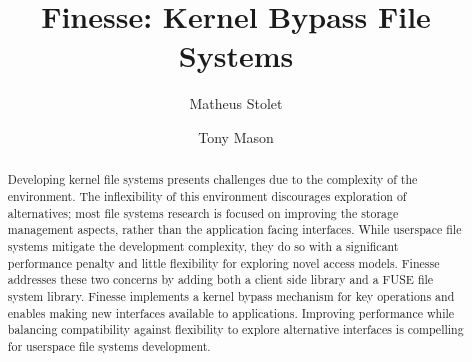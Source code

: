 \documentclass[sigplan,10pt,letter,plain]{acmart}
\begin{document}
\title{Finesse: Kernel Bypass File Systems}


\author{Matheus Stolet}
\author{Tony Mason}

\renewcommand{\shortauthors}{M. Stolet et al.}

\begin{abstract}
  Developing kernel file systems presents challenges due to the complexity of the environment.  The inflexibility of this environment discourages exploration of alternatives; most file systems research is focused on improving the storage management aspects, rather than the application facing interfaces.  While userspace file systems mitigate the development complexity, they do so with a significant performance penalty and little flexibility for exploring novel access models.  Finesse addresses these two concerns by adding both a client side library and a FUSE file system library.  Finesse implements a kernel bypass mechanism for key operations and enables making new interfaces available to applications.  Improving performance while balancing compatibility against flexibility to explore alternative interfaces is compelling for userspace file systems development.
\end{abstract}


\maketitle
\end{document}
